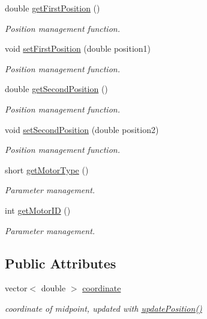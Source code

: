 {\bf }\par
\begin{DoxyCompactItemize}
\item 
double \hyperlink{classMotorGhost_a180f50ab8daecc3f09d4bc8200f1edff}{get\+First\+Position} ()
\begin{DoxyCompactList}\small\item\em Position management function. \end{DoxyCompactList}\item 
void \hyperlink{classMotorGhost_ad78f17ef57c3ccf90d2b78e554c3cf85}{set\+First\+Position} (double position1)
\begin{DoxyCompactList}\small\item\em Position management function. \end{DoxyCompactList}\item 
double \hyperlink{classMotorGhost_a1de3231a90ef1de485591f77bc52ef7a}{get\+Second\+Position} ()
\begin{DoxyCompactList}\small\item\em Position management function. \end{DoxyCompactList}\item 
void \hyperlink{classMotorGhost_aedc47fdd28d95809af9859a64a18117e}{set\+Second\+Position} (double position2)
\begin{DoxyCompactList}\small\item\em Position management function. \end{DoxyCompactList}\end{DoxyCompactItemize}

{\bf }\par
\begin{DoxyCompactItemize}
\item 
short \hyperlink{classMotorGhost_af0c78c2ed50a66cc57025fa818bda02b}{get\+Motor\+Type} ()
\begin{DoxyCompactList}\small\item\em Parameter management. \end{DoxyCompactList}\item 
int \hyperlink{classMotorGhost_a62ddebe9da16e27e0f3c9df23fc73bce}{get\+Motor\+I\+D} ()
\begin{DoxyCompactList}\small\item\em Parameter management. \end{DoxyCompactList}\end{DoxyCompactItemize}

\subsection*{Public Attributes}
\begin{DoxyCompactItemize}
\item 
vector$<$ double $>$ \hyperlink{classMotorGhost_ad67e83cfbc9157c0eda5139071ba98f6}{coordinate}
\begin{DoxyCompactList}\small\item\em coordinate of midpoint, updated with \hyperlink{classMotorGhost_af5160d203173a203b91bfe2e1461acf8}{update\+Position()} \end{DoxyCompactList}\end{DoxyCompactItemize}
